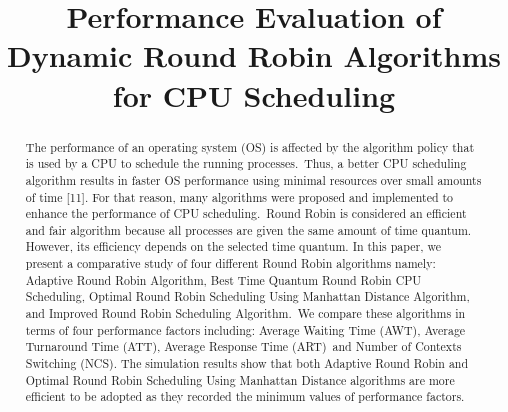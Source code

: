 \documentclass[conference]{IEEEtran}
\begin{document}
    \title{Performance Evaluation of Dynamic Round Robin Algorithms for CPU Scheduling}

    \author{
        \vspace{1em}
    }

    \maketitle

    \begin{abstract}
        The performance of an operating system (OS) is
        affected by the algorithm policy that is used by a CPU
        to schedule the running processes.~Thus, a better CPU
        scheduling algorithm results in faster OS performance
        using minimal resources over small amounts of time [11].
        For that reason, many algorithms were proposed and implemented
        to enhance the performance of CPU scheduling.~Round Robin is
        considered an efficient and fair algorithm because all
        processes are given the same amount of time quantum.
        However, its efficiency depends on the selected time quantum.
        In this paper, we present a comparative study of four different
        Round Robin algorithms namely: Adaptive Round Robin Algorithm,
        Best Time Quantum Round Robin CPU Scheduling, Optimal Round
        Robin Scheduling Using Manhattan Distance Algorithm, and
        Improved Round Robin Scheduling Algorithm.~We compare these
        algorithms in terms of four performance factors including:
        Average Waiting Time (AWT), Average Turnaround Time (ATT),
        Average Response Time (ART)~and Number of Contexts Switching (NCS).
        The simulation results show that both Adaptive Round Robin
        and Optimal Round Robin Scheduling Using Manhattan Distance
        algorithms are more efficient to be adopted as they recorded
        the minimum values of performance factors.
    \end{abstract}
\end{document}
